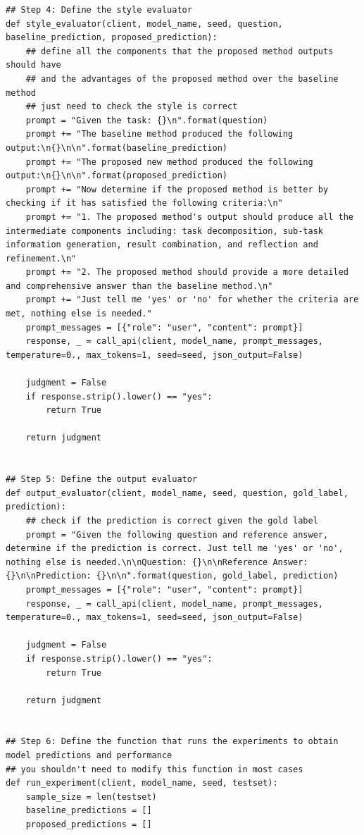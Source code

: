 \begin{lstlisting}
## Step 4: Define the style evaluator
def style_evaluator(client, model_name, seed, question, baseline_prediction, proposed_prediction):
    ## define all the components that the proposed method outputs should have
    ## and the advantages of the proposed method over the baseline method
    ## just need to check the style is correct
    prompt = "Given the task: {}\n".format(question)
    prompt += "The baseline method produced the following output:\n{}\n\n".format(baseline_prediction)
    prompt += "The proposed new method produced the following output:\n{}\n\n".format(proposed_prediction)
    prompt += "Now determine if the proposed method is better by checking if it has satisfied the following criteria:\n"
    prompt += "1. The proposed method's output should produce all the intermediate components including: task decomposition, sub-task information generation, result combination, and reflection and refinement.\n"
    prompt += "2. The proposed method should provide a more detailed and comprehensive answer than the baseline method.\n"
    prompt += "Just tell me 'yes' or 'no' for whether the criteria are met, nothing else is needed."
    prompt_messages = [{"role": "user", "content": prompt}]
    response, _ = call_api(client, model_name, prompt_messages, temperature=0., max_tokens=1, seed=seed, json_output=False)
    
    judgment = False
    if response.strip().lower() == "yes":
        return True 
    
    return judgment


## Step 5: Define the output evaluator
def output_evaluator(client, model_name, seed, question, gold_label, prediction):
    ## check if the prediction is correct given the gold label
    prompt = "Given the following question and reference answer, determine if the prediction is correct. Just tell me 'yes' or 'no', nothing else is needed.\n\nQuestion: {}\n\nReference Answer: {}\n\nPrediction: {}\n\n".format(question, gold_label, prediction)
    prompt_messages = [{"role": "user", "content": prompt}]
    response, _ = call_api(client, model_name, prompt_messages, temperature=0., max_tokens=1, seed=seed, json_output=False)
    
    judgment = False
    if response.strip().lower() == "yes":
        return True 
    
    return judgment


## Step 6: Define the function that runs the experiments to obtain model predictions and performance
## you shouldn't need to modify this function in most cases
def run_experiment(client, model_name, seed, testset):
    sample_size = len(testset) 
    baseline_predictions = []
    proposed_predictions = []


\end{lstlisting}
